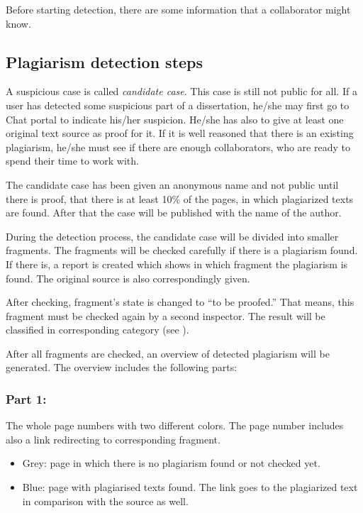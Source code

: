 Before starting detection, there are some information that a collaborator might know.

\subsection{Plagiarism detection steps}
A suspicious case is called \textit{candidate case}. This case is still not public for all. If a user has detected some 
suspicious part of a dissertation, he/she may first go to Chat portal to indicate his/her suspicion. He/she has 
also to give at least one original text source as proof for it. If it is well reasoned that there is an existing 
plagiarism, he/she must see if there are enough collaborators, who are ready to spend their time to work with.

The candidate case has been given an anonymous name and not public until there is proof, that there is at 
least 10\% of the pages, in which plagiarized texts are found. After that the case will be published with the 
name of the author.

During the detection process, the candidate case will be divided into smaller fragments. The fragments will be checked 
carefully if there is a plagiarism found. If there is, a report is created which shows in which fragment the 
plagiarism is found. The original source is also correspondingly given.

After checking, fragment’s state is changed to \enquote{to be proofed.} That means, this fragment must be checked again  by a 
second inspector. The result will be classified in corresponding category (see ).

After all fragments are checked, an overview of detected plagiarism will be generated. The overview includes the following 
parts:

\subsubsection{Part 1:} 

The whole page numbers with two different colors. The page number includes also a link redirecting to corresponding 
fragment.

\begin{itemize}
\item Grey: page in which there is no plagiarism found or not checked yet.
\item Blue: page with plagiarised texts found. The link goes to the plagiarized text in comparison with  the source as well.
\end{itemize}


